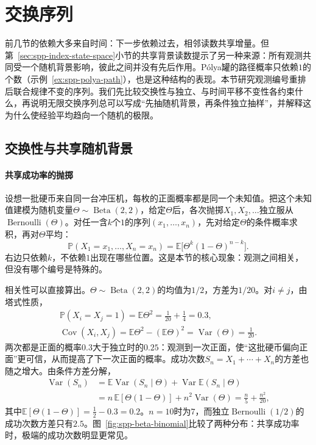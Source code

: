 
\section{交换序列}
\label{sec:spp-exchangeable}

前几节的依赖大多来自时间：下一步依赖过去，相邻读数共享增量。但第~\ref{sec:spp-index-state-space}小节的共享背景读数提示了另一种来源：所有观测共同受一个随机背景影响，彼此之间并没有先后作用。Pólya罐的路径概率只依赖$1$的个数（示例~\ref{ex:spp-polya-path}），也是这种结构的表现。本节研究观测编号重排后联合规律不变的序列。我们先比较交换性与独立、与时间平移不变性各约束什么，再说明无限交换序列总可以写成“先抽随机背景，再条件独立抽样”，并解释这为什么使经验平均趋向一个随机的极限。

\subsection{交换性与共享随机背景}
\label{sec:spp-exchangeability}

\paragraph{共享成功率的抛掷}
设想一批硬币来自同一台冲压机，每枚的正面概率都是同一个未知值。把这个未知值建模为随机变量$\Theta\sim\operatorname{Beta}(2,2)$，给定$\Theta$后，各次抛掷$X_1,X_2,\ldots$独立服从$\operatorname{Bernoulli}(\Theta)$。对任一含$k$个$1$的序列$(x_1,\ldots,x_n)$，先对给定$\Theta$的条件概率求积，再对$\Theta$平均：
\[
  \mathbb P(X_1=x_1,\ldots,X_n=x_n)=\mathbb E\bigl[\Theta^k(1-\Theta)^{n-k}\bigr].
\]
右边只依赖$k$，不依赖$1$出现在哪些位置。这是本节的核心现象：观测之间相关，但没有哪个编号是特殊的。

相关性可以直接算出。$\Theta\sim\operatorname{Beta}(2,2)$的均值为$1/2$，方差为$1/20$。对$i\ne j$，由塔式性质，
\begin{gather*}
  \mathbb P(X_i=X_j=1)=\mathbb E\Theta^2=\frac1{20}+\frac14=0.3,\\
  \operatorname{Cov}(X_i,X_j)=\mathbb E\Theta^2-(\mathbb E\Theta)^2=\operatorname{Var}(\Theta)=\frac1{20}.
\end{gather*}
两次都是正面的概率$0.3$大于独立时的$0.25$：观测到一次正面，使“这批硬币偏向正面”更可信，从而提高了下一次正面的概率。成功次数$S_n=X_1+\cdots+X_n$的方差也随之增大。由条件方差分解，
\[
  \begin{aligned}
  \operatorname{Var}(S_n)&=\mathbb E\operatorname{Var}(S_n\mid\Theta)+\operatorname{Var}\mathbb E(S_n\mid\Theta)\\
  &=n\,\mathbb E[\Theta(1-\Theta)]+n^2\operatorname{Var}(\Theta)=\frac n5+\frac{n^2}{20},
  \end{aligned}
\]
其中$\mathbb E[\Theta(1-\Theta)]=\frac12-0.3=0.2$。$n=10$时为$7$，而独立$\operatorname{Bernoulli}(1/2)$的成功次数方差只有$2.5$。图~\ref{fig:spp-beta-binomial}比较了两种分布：共享成功率时，极端的成功次数明显更常见。

